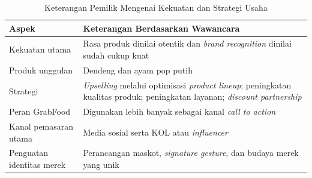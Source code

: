 \begin{table}[!htbp]
    \centering
    \caption{Keterangan Pemilik Mengenai Kekuatan dan Strategi Usaha}
    \label{tab:kekuatan_strategi_wawancara}
    \begin{tabularx}{\textwidth}{|J|Y|}
        \toprule
        \textbf{Aspek}            & \textbf{Keterangan Berdasarkan Wawancara}                                                                                                      \\ \hline
        \midrule
        Kekuatan utama            & Rasa produk dinilai otentik dan \textit{brand recognition} dinilai sudah cukup kuat                                                            \\ \hline
        Produk unggulan           & Dendeng dan ayam pop putih                                                                                                                     \\ \hline
        Strategi                  & \textit{Upselling} melalui optimisasi \textit{product lineup}; peningkatan kualitas produk; peningkatan layanan; \textit{discount partnership} \\ \hline
        Peran GrabFood            & Digunakan lebih banyak sebagai kanal \textit{call to action}                                                                                   \\ \hline
        Kanal pemasaran utama     & Media sosial serta KOL atau \textit{influencer}                                                                                                \\ \hline
        Penguatan identitas merek & Perancangan maskot, \textit{signature gesture}, dan budaya merek yang unik                                                                     \\ \hline
        \bottomrule
    \end{tabularx}
\end{table}

